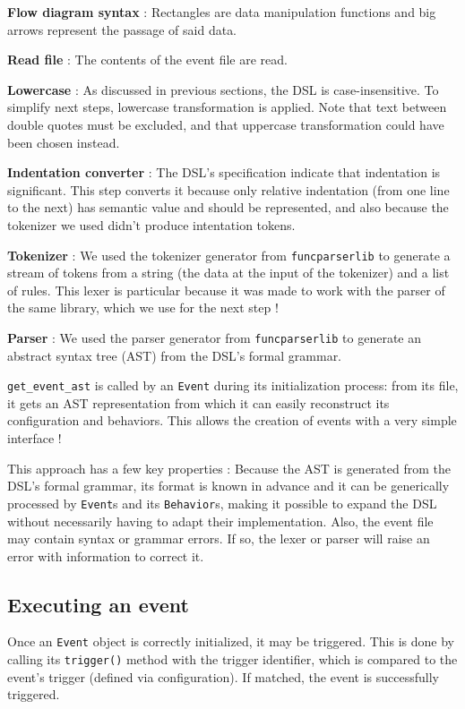 \documentclass[11pt]{article}
\begin{document}
{\textbf{Flow diagram syntax} : Rectangles are data manipulation functions and big arrows represent the passage of said data.

\textbf{Read file} : The contents of the event file are read.

\textbf{Lowercase} : As discussed in previous sections, the DSL is case-insensitive. To simplify next steps, lowercase transformation is applied. Note that text between double quotes must be excluded, and that uppercase transformation could have been chosen instead.

\textbf{Indentation converter} : The DSL's specification indicate that indentation is significant. This step converts it because only relative indentation (from one line to the next) has semantic value and should be represented, and also because the tokenizer we used didn't produce intentation tokens.

\textbf{Tokenizer} : We used the tokenizer generator from \texttt{funcparserlib} \cite{funcparserlib} to generate a stream of tokens from a string (the data at the input of the tokenizer) and a list of rules. This lexer is particular because it was made to work with the parser of the same library, which we use for the next step !

\textbf{Parser} : We used the parser generator from \texttt{funcparserlib} \cite{funcparserlib} to generate an abstract syntax tree (AST) from the DSL's formal grammar.


\verb|get_event_ast| is called by an \texttt{Event} during its initialization process: from its file, it gets an AST representation from which it can easily reconstruct its configuration and behaviors. This allows the creation of events with a very simple interface !

This approach has a few key properties : Because the AST is generated from the DSL's formal grammar, its format is known in advance and it can be generically processed by \texttt{Event}s and its \texttt{Behavior}s, making it possible to expand the DSL without necessarily having to adapt  their implementation. Also, the event file may contain syntax or grammar errors. If so, the lexer or parser will raise an error with information to correct it.

\newpage
\subsection{Executing an event}

Once an \texttt{Event} object is correctly initialized, it may be triggered. This is done by calling its \texttt{trigger()} method with the trigger identifier, which is compared to the event's trigger (defined via configuration). If matched, the event is successfully triggered.

}
\end{document}
